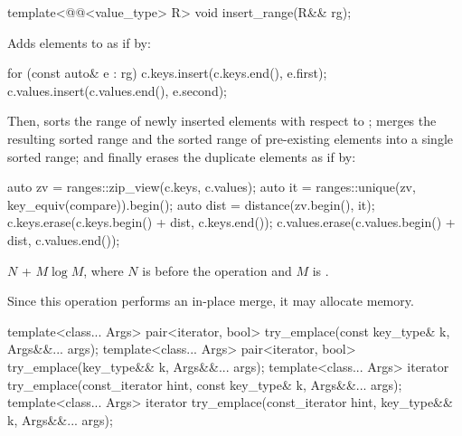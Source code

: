 %
\begin{itemdecl}
template<@@<value_type> R>
  void insert_range(R&& rg);
\end{itemdecl}

\begin{itemdescr}
\pnum
\effects
Adds elements to  as if by:
\begin{codeblock}
for (const auto& e : rg) {
  c.keys.insert(c.keys.end(), e.first);
  c.values.insert(c.values.end(), e.second);
}
\end{codeblock}
Then, sorts the range of newly inserted elements
with respect to ;
merges the resulting sorted range and
the sorted range of pre-existing elements into a single sorted range; and
finally erases the duplicate elements as if by:
\begin{codeblock}
auto zv = ranges::zip_view(c.keys, c.values);
auto it = ranges::unique(zv, key_equiv(compare)).begin();
auto dist = distance(zv.begin(), it);
c.keys.erase(c.keys.begin() + dist, c.keys.end());
c.values.erase(c.values.begin() + dist, c.values.end());
\end{codeblock}

\pnum
\complexity
$N$ + $M \log M$,
where $N$ is  before the operation and
$M$ is .

\pnum
\remarks
Since this operation performs an in-place merge, it may allocate memory.
\end{itemdescr}

%
\begin{itemdecl}
template<class... Args>
  pair<iterator, bool> try_emplace(const key_type& k, Args&&... args);
template<class... Args>
  pair<iterator, bool> try_emplace(key_type&& k, Args&&... args);
template<class... Args>
  iterator try_emplace(const_iterator hint, const key_type& k, Args&&... args);
template<class... Args>
  iterator try_emplace(const_iterator hint, key_type&& k, Args&&... args);
\end{itemdecl}


